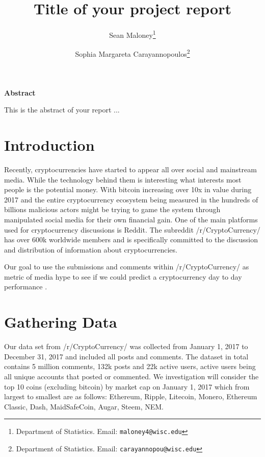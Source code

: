 \documentclass[12pt]{article}
\begin{document}
\title{Title of your project report}  

\author{
Sean Maloney\thanks{Department of Statistics.  Email: {\tt maloney4@wisc.edu}}  %
\and 
Sophia Margareta Carayannopoulos\thanks{Department of Statistics.  Email: {\tt  carayannopou@wisc.edu}}  %
}

\maketitle

\begin{center}
\textbf{Abstract}
\end{center}

This is the abstract of your report ... 


\thispagestyle{empty}

\newpage


\section{Introduction}\label{intro}
\indent \indent Recently, cryptocurrencies have started to appear all over social and mainstream media. While the technology behind them is interesting what interests most people is the potential money. With bitcoin increasing over 10x in value during 2017 and the entire cryptocurrency ecosystem being measured in the hundreds of billions malicious actors might be trying to game the system through manipulated social media for their own financial gain.
\indent One of the main platforms used for cryptocurrency discussions is Reddit. The subreddit /r/CryptoCurrency/ has over 600k worldwide members and is specifically committed to the discussion and distribution of information about cryptocurrencies. 

Our goal to use the submissions and comments within /r/CryptoCurrency/ as metric of media hype to see if we could predict a cryptocurrency day to day performance .

\section{Gathering Data}\label{datagather}
\indent \indent Our data set from  /r/CryptoCurrency/ was collected from January 1, 2017 to December 31, 2017 and included all posts and comments. The dataset in total contains 5 million comments, 132k posts and 22k active users, active users being all unique accounts that posted or commented. We investigation will consider the top 10 coins (excluding bitcoin) by market cap on January 1, 2017 which from largest to smallest are as follows: Ethereum, Ripple, Litecoin, Monero, Ethereum Classic, Dash, MaidSafeCoin, Augar, Steem, NEM.
\end{document}
